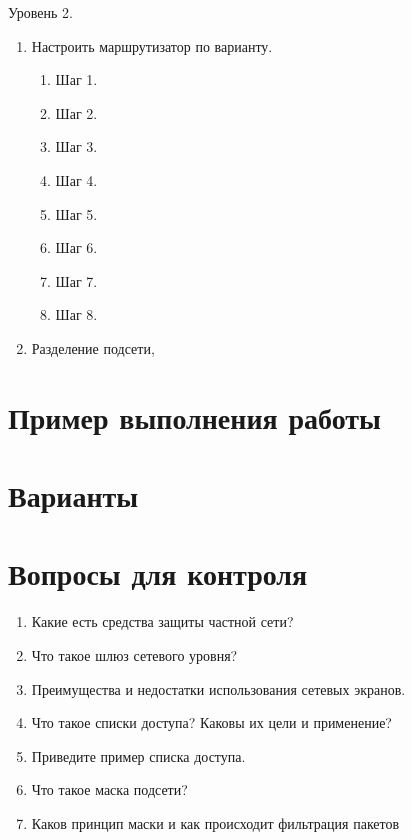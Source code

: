 \noindent Уровень 2.

\begin{enumerate}

  \item Настроить маршрутизатор по варианту.
    \begin{enumerate}
        \item Шаг 1.
        \item Шаг 2.
        \item Шаг 3.
        \item Шаг 4.
        \item Шаг 5.
        \item Шаг 6.
        \item Шаг 7.
        \item Шаг 8.
    \end{enumerate}
  \item Разделение подсети, 
\end{enumerate}
\section{Пример выполнения работы}\label{sect3_c}
%
\section{Варианты}\label{sect3_d}
%
\section{Вопросы для контроля}\label{sect3_e}
%
\begin{enumerate}
  \item Какие есть средства защиты частной сети?
  \item Что такое шлюз сетевого уровня?
  \item Преимущества и недостатки использования сетевых экранов.
  \item Что такое списки доступа? Каковы их цели и применение?
  \item Приведите пример списка доступа.
  \item Что такое маска подсети?
  \item Каков принцип маски и как происходит фильтрация
      пакетов
\end{enumerate}
